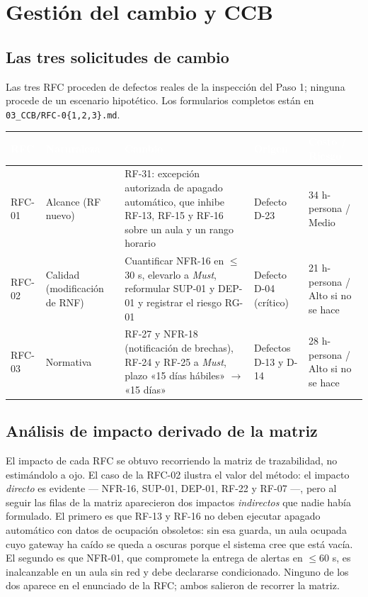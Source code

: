 \documentclass[11pt,letterpaper]{article}
\newcommand{\thead}[1]{\cellcolor{uteqverde}\textcolor{white}{\textbf{#1}}}
\begin{document}
\section{Gestión del cambio y CCB}

\subsection{Las tres solicitudes de cambio}
Las tres RFC proceden de defectos reales de la inspección del Paso 1; ninguna procede de un escenario hipotético. Los formularios completos están en \texttt{03\_CCB/RFC-0\{1,2,3\}.md}.

\begin{center}
\small
\begin{tabular}{|p{1.4cm}|p{2.6cm}|p{4.6cm}|p{2.3cm}|p{3.3cm}|}
\hline
\thead{RFC} & \thead{Naturaleza} & \thead{Cambio} & \thead{Origen} & \thead{Costo / Riesgo} \\ \hline
RFC-01 & Alcance (RF nuevo) & RF-31: excepción autorizada de apagado automático, que inhibe RF-13, RF-15 y RF-16 sobre un aula y un rango horario & Defecto D-23 & 34 h-persona / Medio \\ \hline
RFC-02 & Calidad (modificación de RNF) & Cuantificar NFR-16 en $\leq$30 s, elevarlo a \emph{Must}, reformular SUP-01 y DEP-01 y registrar el riesgo RG-01 & Defecto D-04 (crítico) & 21 h-persona / Alto si no se hace \\ \hline
RFC-03 & Normativa & RF-27 y NFR-18 (notificación de brechas), RF-24 y RF-25 a \emph{Must}, plazo «15 días hábiles» $\rightarrow$ «15 días» & Defectos D-13 y D-14 & 28 h-persona / Alto si no se hace \\ \hline
\end{tabular}
\end{center}

\subsection{Análisis de impacto derivado de la matriz}
El impacto de cada RFC se obtuvo recorriendo la matriz de trazabilidad, no estimándolo a ojo. El caso de la RFC-02 ilustra el valor del método: el impacto \emph{directo} es evidente --- NFR-16, SUP-01, DEP-01, RF-22 y RF-07 ---, pero al seguir las filas de la matriz aparecieron dos impactos \emph{indirectos} que nadie había formulado. El primero es que RF-13 y RF-16 no deben ejecutar apagado automático con datos de ocupación obsoletos: sin esa guarda, un aula ocupada cuyo gateway ha caído se queda a oscuras porque el sistema cree que está vacía. El segundo es que NFR-01, que compromete la entrega de alertas en $\leq$60 s, es inalcanzable en un aula sin red y debe declararse condicionado. Ninguno de los dos aparece en el enunciado de la RFC; ambos salieron de recorrer la matriz.
\end{document}
